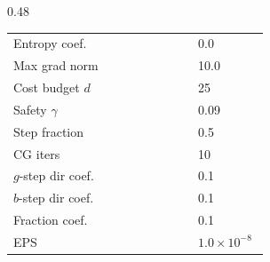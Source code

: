 \documentclass{article}
\theoremstyle{plain}
\theoremstyle{definition}
\theoremstyle{remark}
\begin{document}
\begin{table}[t]
\begin{subtable}[t]{0.48\textwidth}
\begin{tabular}{@{}p{0.68\linewidth}p{0.26\linewidth}@{}}
Entropy coef. & 0.0 \\
Max grad norm & 10.0 \\
\midrule
Cost budget $d$ & 25 \\
Safety $\gamma$ & 0.09 \\
Step fraction & 0.5 \\
CG iters & 10 \\
$g$-step dir coef. & 0.1 \\
$b$-step dir coef. & 0.1 \\
Fraction coef. & 0.1 \\
EPS & $1.0\times 10^{-8}$ \\
\bottomrule
\end{tabular}
\end{subtable}
\end{table}

\end{document}
